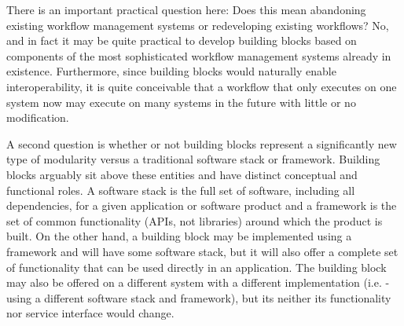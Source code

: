 There is an important practical question here: Does this mean abandoning
existing workflow management systems or redeveloping existing workflows? No, and
in fact it may be quite practical to develop building blocks based on components
of the most sophisticated workflow management systems already in existence.
Furthermore, since building blocks would naturally enable interoperability, it
is quite conceivable that a workflow that only executes on one system now may
execute on many systems in the future with little or no modification. 

A second question is whether or not building blocks represent a significantly new
type of modularity versus a traditional software stack or framework. Building blocks
arguably sit above these entities and have distinct conceptual and functional roles.
A software stack is the full set of software, including all dependencies, for a given
application or software product and a framework is the set of common functionality
(APIs, not libraries) around which the product is built. On the other hand, a
building block may be implemented using a framework and will have some software stack,
but it will also offer a complete set of functionality that can be used directly in
an application. The building block may also be offered on a different system with a
different implementation (i.e. - using a different software stack and framework), but
its neither its functionality nor service interface would change.